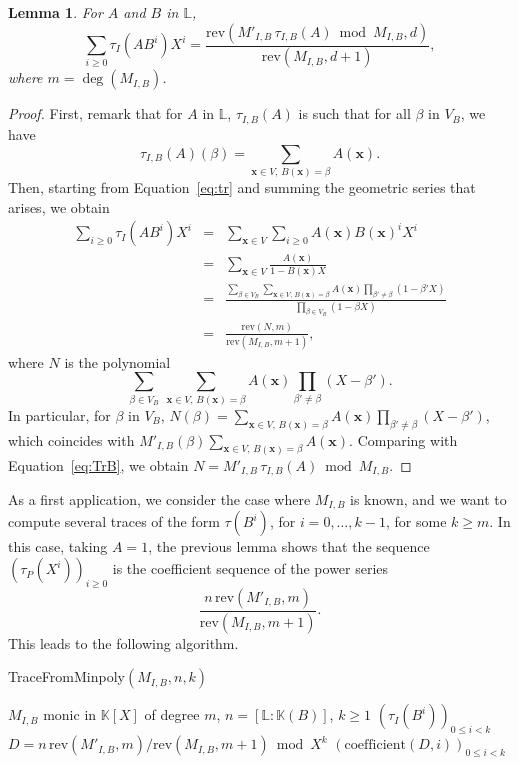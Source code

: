\documentclass[12pt]{article}
\def\K {\ensuremath{\mathbb{K}}}
\def\L {\ensuremath{\mathbb{L}}}
\def\coeff {\ensuremath{\mathrm{coefficient}}}
\def\rev {\ensuremath{\mathrm{rev}}}
\def\x {\ensuremath{\mathbf{x}}}
\newtheorem{Lemma}{Lemma}
\begin{document}
\begin{Lemma}\label{lemma:trace:1}
  For $A$ and $B$ in $\L$, 
  $$\sum_{i \ge 0} \tau_I(A B^i) X^i = \frac{\rev( M'_{I,B}\, \tau_{I,B}
    (A) \bmod M_{I,B},d)}{\rev(M_{I,B},d+1)},$$ where
  $m=\deg(M_{I,B})$.
\end{Lemma}
\begin{proof}
First, remark that for $A$ in $\L$, 
$\tau_{I,B}(A)$ is such that for all $\beta$ in $V_B$, we have
\begin{equation}\label{eq:TrB}
\tau_{I,B}(A)(\beta) = \sum_{\x \in V,\, B(\x)=\beta} A(\x).  
\end{equation}
Then, starting from Equation~\eqref{eq:tr} and summing the geometric
series that arises, we obtain
\begin{eqnarray*}
\sum_{i \ge 0} \tau_I(A B^i) X^i &=& \sum_{\x \in V} \sum_{i \ge 0} A(\x)B(\x)^i X^i\\
&=& \sum_{\x \in V} \frac{A(\x)}{1-B(\x)X}\\
&=& \frac{\sum_{\beta \in V_B} \sum_{\x \in V,\, B(\x)=\beta} A(\x) \prod_{\beta'\ne \beta} (1-\beta' X)}
    {\prod_{\beta \in V_B}(1-\beta X)}\\
&=& \frac{\rev(N,m)}{\rev(M_{I,B},m+1)},
\end{eqnarray*}
where $N$ is the polynomial
$$\sum_{\beta \in V_B}\ \sum_{\x \in V,\, B(\x)=\beta} A(\x) \prod_{\beta'\ne \beta} (X-\beta' ).$$
In particular, for  $\beta$ in $V_B$, $N(\beta)=\sum_{\x \in V,\, B(\x)=\beta} A(\x) \prod_{\beta'\ne \beta} (X-\beta' )$,
which coincides with $M'_{I,B}(\beta)\sum_{\x \in V,\, B(\x)=\beta} A(\x)$.
Comparing with Equation~\eqref{eq:TrB}, we obtain 
$N=M'_{I,B}\, \tau_{I,B}(A) \bmod M_{I,B}$.
\end{proof}

As a first application, we consider the case where $M_{I,B}$ is
known, and we want to compute several traces of the form $\tau(B^i)$,
for $i=0,\dots,k-1$, for some $k \ge m$. In this case, taking $A=1$,
the previous lemma shows that the sequence $(\tau_{P}(X^i))_{i \ge 0}$
is the coefficient sequence of the power series
  $$ \frac{n\, \rev(M'_{I,B} ,m)}{\rev(M_{I,B},m+1)}.$$ This leads to
the following algorithm.

\begin{algorithm}[H]
  \caption{TraceFromMinpoly$(M_{I,B}, n, k)$}
  \begin{algorithmic}[1]
    \REQUIRE  $M_{I,B}$ monic in $\K[X]$ of degree $m$, $n=[\L:\K(B)]$, $k \ge 1$
    \ENSURE $(\tau_I(B^i))_{0 \le i < k}$
    \STATE\label{algo:minpolytotrace:1} $D = n\, \rev(M'_{I,B}, m)/\rev(M_{I,B}, m+1) \bmod X^k$
    \RETURN $(\coeff(D,i))_{0 \le i < k}$
  \end{algorithmic}
  \label{algo:minpolytotrace}
\end{algorithm}
\end{document}
